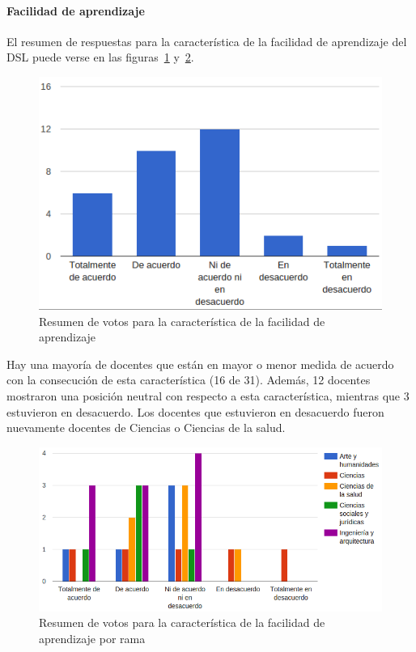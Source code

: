 \newpage
\paragraph*{Facilidad de aprendizaje}

El resumen de respuestas para la característica de la facilidad de aprendizaje del DSL puede verse en las figuras~\ref{fig:evalmetodo:dsl:aprendizaje} y~\ref{fig:evalmetodo:dsl:aprendizaje:rama}.

\begin{figure}[h]
  \begin{center}
    \includegraphics[scale=0.5]{C_DSL_aprendizaje.png}
  \end{center}
  \caption{Resumen de votos para la característica de la facilidad de aprendizaje}
  \label{fig:evalmetodo:dsl:aprendizaje}
\end{figure}

Hay una mayoría de docentes que están en mayor o menor medida de acuerdo con la consecución de esta característica (16 de 31). Además, 12 docentes mostraron una posición neutral con respecto a esta característica, mientras que 3 estuvieron en desacuerdo. Los docentes que estuvieron en desacuerdo fueron nuevamente docentes de Ciencias o Ciencias de la salud.

\begin{figure}[h]
  \begin{center}
    \includegraphics[scale=0.5]{C_DSL_aprendizaje_rama.png}
  \end{center}
  \caption{Resumen de votos para la característica de la facilidad de aprendizaje por rama}
  \label{fig:evalmetodo:dsl:aprendizaje:rama}
\end{figure}

